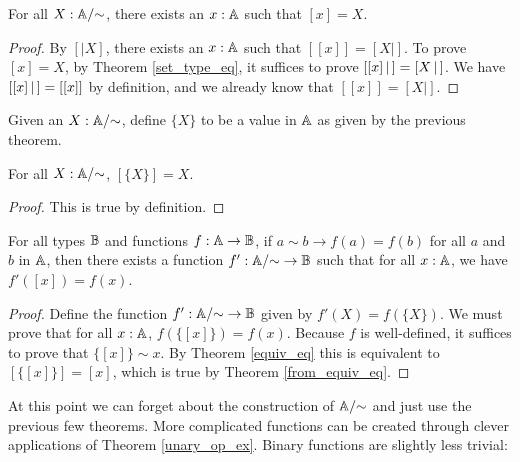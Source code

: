 \documentclass[../math.tex]{subfiles}
\begin{document}
\begin{theorem}
    For all $X : \mathbb{A}/{\sim}$, there exists an $x : \mathbb{A}$ such that $[x] = X$.
\end{theorem}
\begin{proof}
    By $[|X]$, there exists an $x : \mathbb{A}$ such that $[ [x]] = [X|]$.  To prove
    $[x] = X$, by Theorem \ref{set_type_eq}, it suffices to prove $[ [x]\, |\,] =
    [ X\, |\,]$.  We have $[ [x]\, |\,] = [ [x]]$ by definition, and we already know
    that $[ [x]] = [X|]$.
\end{proof}

\begin{definition}
    Given an $X : \mathbb{A}/{\sim}$, define $\{X\}$ to be a value in $\mathbb{A}$ as given by
    the previous theorem.
\end{definition}

\begin{theorem} \label{from_equiv_eq}
    For all $X : \mathbb{A}/{\sim}$, $[\{X\}] = X$.
\end{theorem}
\begin{proof}
    This is true by definition.
\end{proof}

\begin{theorem} \label{unary_op_ex}
    For all types $\mathbb{B}$ and functions $f : \mathbb{A} \to \mathbb{B}$, if $a \sim b \to f(a) =
    f(b)$ for all $a$ and $b$ in $\mathbb{A}$, then there exists a function $f' :
    \mathbb{A}/{\sim} \to \mathbb{B}$ such that for all $x : \mathbb{A}$, we have $f'([x]) = f(x)$.
\end{theorem}
\begin{proof}
    Define the function $f' : \mathbb{A}/{\sim} \to \mathbb{B}$ given by $f'(X) = f(\{X\})$.  We
    must prove that for all $x : \mathbb{A}$, $f(\{[x]\}) = f(x)$.  Because $f$ is
    well-defined, it suffices to prove that $\{[x]\} \sim x$.  By Theorem
    \ref{equiv_eq} this is equivalent to $[\{[x]\}] = [x]$, which is true by
    Theorem \ref{from_equiv_eq}.
\end{proof}

At this point we can forget about the construction of $\mathbb{A}/{\sim}$ and just use
the previous few theorems.  More complicated functions can be created through
clever applications of Theorem \ref{unary_op_ex}.  Binary functions are slightly
less trivial:
\end{document}
